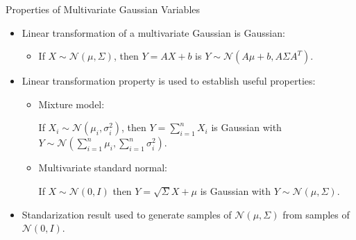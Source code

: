 \documentclass[9pt]{beamer}
\begin{document}
%
\begin{frame}{Properties of Multivariate Gaussian Variables}

\begin{itemize}
\item Linear transformation of a multivariate Gaussian is Gaussian: 
\begin{itemize}
\item If $X\sim\mathcal{N}(\mu,\Sigma)$, then $Y=AX+b$ is $Y\sim \mathcal{N}(A\mu+b,A\Sigma A^T)$. 
\end{itemize}
\vspace{0.1in}
\item Linear transformation property is used to establish useful properties:
\begin{itemize}
\item Mixture model:

 If $X_i\sim \mathcal{N}(\mu_i,\sigma_i^2)$, then $Y=\sum_{i=1}^nX_i$ is Gaussian with $Y\sim\mathcal{N}(\sum_{i=1}^n\mu_i,\sum_{i=1}^n\sigma_i^2)$. 
 \vspace{0.1in}
\item Multivariate standard normal: 

If $X\sim\mathcal{N}(0,{I})$ then $Y=\sqrt{\Sigma}X+\mu$ is Gaussian with $Y\sim\mathcal{N}(\mu,\Sigma)$.
\end{itemize}
\item Standarization result used to generate samples of $\mathcal{N}(\mu,\Sigma)$ from samples of $\mathcal{N}(0,I)$.
\end{itemize}

\end{frame}
\end{document}
